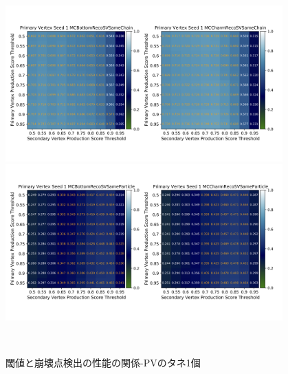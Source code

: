 \begin{figure}[htbp]
   \begin{minipage}{1.0\textwidth}
   \centering
    \includegraphics[trim = 0 140 0 140, width=0.95\textwidth, clip]{Figure/4VertexFinderwithDL/4-2-2-2TrackEfficiencySameChain.png}
   \end{minipage}
   
   \begin{minipage}{1.0\textwidth}
   \centering
    \includegraphics[trim = 0 140 0 140, width=0.95\textwidth, clip]{Figure/4VertexFinderwithDL/4-2-2-2TrackEfficiencySameParticle.png}
   \end{minipage} 
  \caption{閾値と崩壊点検出の性能の関係-PVのタネ1個}
  \label{4-2-2-2TrackEfficiency}
\end{figure}


